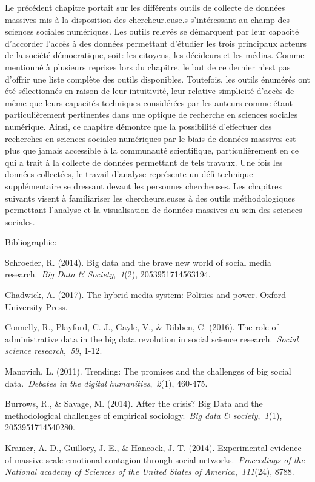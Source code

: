 \documentclass[
  letterpaper,
]{scrbook}
\begin{document}
Le précédent chapitre portait sur les différents outils de collecte de
données massives mis à la disposition des chercheur.euse.s s'intéressant
au champ des sciences sociales numériques. Les outils relevés se
démarquent par leur capacité d'accorder l'accès à des données permettant
d'étudier les trois principaux acteurs de la société démocratique, soit:
les citoyens, les décideurs et les médias. Comme mentionné à plusieurs
reprises lors du chapitre, le but de ce dernier n'est pas d'offrir une
liste complète des outils disponibles. Toutefois, les outils énumérés
ont été sélectionnés en raison de leur intuitivité, leur relative
simplicité d'accès de même que leurs capacités techniques considérées
par les auteurs comme étant particulièrement pertinentes dans une
optique de recherche en sciences sociales numérique. Ainsi, ce chapitre
démontre que la possibilité d'effectuer des recherches en sciences
sociales numériques par le biais de données massives est plus que jamais
accessible à la communauté scientifique, particulièrement en ce qui a
trait à la collecte de données permettant de tels travaux. Une fois les
données collectées, le travail d'analyse représente un défi technique
supplémentaire se dressant devant les personnes chercheuses. Les
chapitres suivants visent à familiariser les chercheurs.euses à des
outils méthodologiques permettant l'analyse et la visualisation de
données massives au sein des sciences sociales.

Bibliographie:

Schroeder, R. (2014). Big data and the brave new world of social media
research.~\emph{Big Data \& Society},~\emph{1}(2), 2053951714563194.

Chadwick, A. (2017). The hybrid media system: Politics and power. Oxford
University Press.

Connelly, R., Playford, C. J., Gayle, V., \& Dibben, C. (2016). The role
of administrative data in the big data revolution in social science
research.~\emph{Social science research},~\emph{59}, 1-12.

Manovich, L. (2011). Trending: The promises and the challenges of big
social data.~\emph{Debates in the digital humanities},~\emph{2}(1),
460-475.

Burrows, R., \& Savage, M. (2014). After the crisis? Big Data and the
methodological challenges of empirical sociology.~\emph{Big data \&
society},~\emph{1}(1), 2053951714540280.

Kramer, A. D., Guillory, J. E., \& Hancock, J. T. (2014). Experimental
evidence of massive-scale emotional contagion through social
networks.~\emph{Proceedings of the National academy of Sciences of the
United States of America},~\emph{111}(24), 8788.
\end{document}
